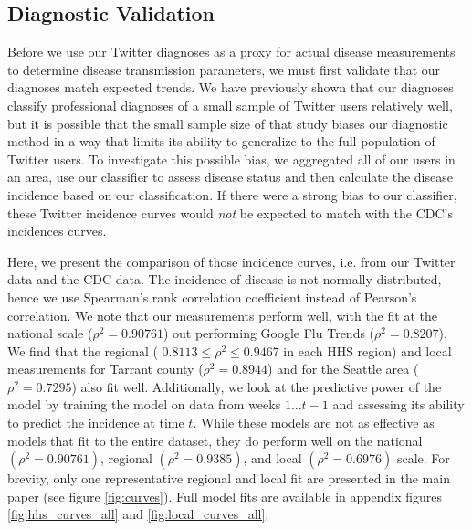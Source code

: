 \subsection{Diagnostic Validation}
\label{subsec:validation}
Before we use our Twitter diagnoses as a proxy for actual disease measurements to determine disease transmission parameters, we must first validate that our diagnoses match expected trends. We have previously shown that our diagnoses classify professional diagnoses of a small sample of Twitter users relatively well, but it is possible that the small sample size of that study biases our diagnostic method in a way that limits its ability to generalize to the full population of Twitter users. To investigate this possible bias, we aggregated all of our users in an area, use our classifier to assess disease status and then calculate the disease incidence based on our classification. If there were a strong bias to our classifier, these Twitter incidence curves would \emph{not} be expected to match with the CDC's incidences curves.

Here, we present the comparison of those incidence curves, i.e. from our Twitter data and the CDC data. The incidence of disease is not normally distributed, hence we use Spearman's rank correlation coefficient instead of Pearson's correlation.  We note that our measurements perform well, with the fit at the national scale (\(\rho^2 = 0.90761\)) out performing Google Flu Trends (\(\rho ^2= 0.8207\)). We find that the regional ( \(0.8113 \leq \rho^2 \leq 0.9467\) in each HHS region) and local measurements for Tarrant county (\(\rho^2 = 0.8944\)) and for the Seattle area (\(\rho^2 = 0.7295\)) also fit well. Additionally, we look at the predictive power of the model by  training the model on data from weeks \(1...t-1\) and assessing its ability to predict the incidence at time \(t\). While these models are not as effective as models that fit to the entire dataset, they do perform well on the national \((\rho^2 = 0.90761)\), regional \( (\rho^2 = 0.9385)\), and local \( (\rho^2 = 0.6976)\) scale. For brevity, only one representative regional and local fit are presented in the main paper (see figure \ref{fig:curves}). Full model fits are available in appendix figures \ref{fig:hhs_curves_all} and \ref{fig:local_curves_all}.


